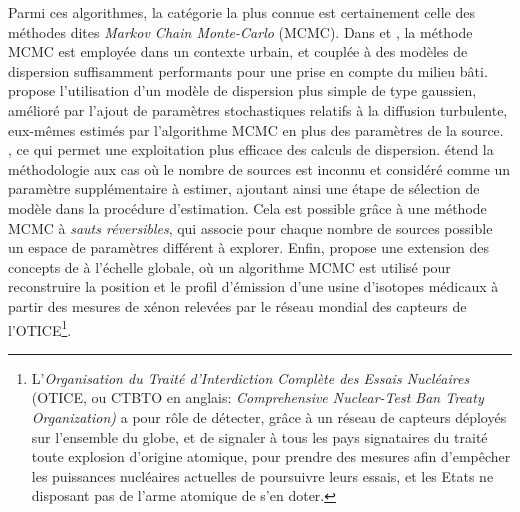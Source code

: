 Parmi ces algorithmes, la catégorie la plus connue est certainement celle des méthodes dites \textit{Markov Chain Monte-Carlo} (MCMC). Dans \cite{Keats2007} et \cite{Chow2008}, la méthode MCMC est employée dans un contexte urbain, et couplée à des modèles de dispersion suffisamment performants pour une prise en compte du milieu bâti. \cite{Senocak2008} propose l'utilisation d'un modèle de dispersion plus simple de type gaussien, amélioré par l'ajout de paramètres stochastiques relatifs à la diffusion turbulente, eux-mêmes estimés par l'algorithme MCMC en plus des paramètres de la source. , ce qui permet une exploitation plus efficace des calculs de dispersion. \cite{Yee2008b} étend la méthodologie aux cas où le nombre de sources est inconnu et considéré comme un paramètre supplémentaire à estimer, ajoutant ainsi une étape de sélection de modèle dans la procédure d'estimation. Cela est possible grâce à une méthode MCMC à \textit{sauts réversibles}, qui associe pour chaque nombre de sources possible un espace de paramètres différent à explorer. Enfin, \cite{Yee2014} propose une extension des concepts de \cite{Keats2007} à l'échelle globale, où un algorithme MCMC est utilisé pour reconstruire la position et le profil d'émission d'une usine d'isotopes médicaux à partir des mesures de xénon relevées par le réseau mondial des capteurs de l'OTICE\footnote{L'\textit{Organisation du Traité d'Interdiction Complète des Essais Nucléaires} (OTICE, ou CTBTO en anglais: \textit{Comprehensive Nuclear-Test Ban Treaty Organization)} a pour rôle de détecter, grâce à un réseau de capteurs déployés sur l'ensemble du globe, et de signaler à tous les pays signataires du traité toute explosion d'origine atomique, pour prendre des mesures afin d'empêcher les puissances nucléaires actuelles de poursuivre leurs essais, et les Etats ne disposant pas de l'arme atomique de s'en doter.}. \\
